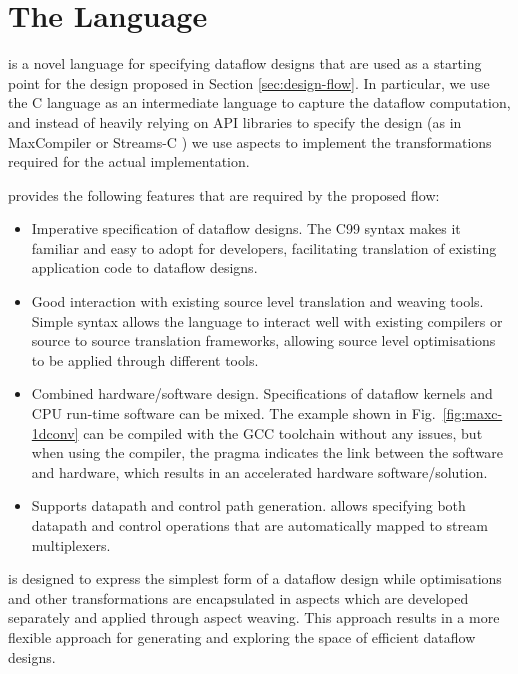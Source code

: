 \section{The \MAXC{} Language}
\label{sec:maxc}

\MAXC{} is a novel language for specifying dataflow designs that are
used as a starting point for the design proposed in Section
\ref{sec:design-flow}. In particular, we use the C language as an
intermediate language to capture the dataflow computation, and instead
of heavily relying on API libraries to specify the design (as in
MaxCompiler \cite{MaxelerTechnologies:2012} or Streams-C
\cite{Gokhale:Stone:Arnold:Kalinowski:2000}) we use aspects to
implement the transformations required for the actual implementation.

\MAXC{} provides the following features that are
required by the proposed flow:

\begin{itemize}
\item Imperative specification of dataflow designs. The C99 syntax
  makes it familiar and easy to adopt for developers, facilitating
  translation of existing application code to dataflow designs.
\item Good interaction with existing source level translation and
  weaving tools. Simple syntax allows the language to interact well
  with existing compilers or source to source translation frameworks,
  allowing source level optimisations to be applied through different
  tools.
\item Combined hardware/software design. Specifications of dataflow
  kernels and CPU run-time software can be mixed. The example shown in
  Fig.~\ref{fig:maxc-1dconv} can be compiled with the GCC toolchain
  without any issues, but when using the \MAXC{} compiler, the pragma
  indicates the link between the software and hardware, which results
  in an accelerated hardware software/solution.
\item Supports datapath and control path generation. \MAXC{} allows
  specifying both datapath and control operations that are
  automatically mapped to stream multiplexers.
\end{itemize}

\MAXC{} is designed to express the simplest form of a dataflow design
while optimisations and other transformations are encapsulated in
aspects which are developed separately and applied through aspect
weaving. This approach results in a more flexible approach for
generating and exploring the space of efficient dataflow designs.

